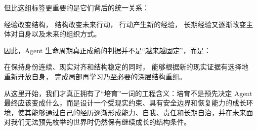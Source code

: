 但比这组标签更重要的是它们背后的统一关系：
\begin{statementbox}
经验改变结构，
结构改变未来行动，
行动产生新的经验，
长期经验又逐渐改变主体对自身以及未来的组织方式。
\end{statementbox}

因此，Agent 生命周期真正成熟的判据并不是“越来越固定”，而是：

\begin{statementbox}
在保持身份连续、现实对齐和结构稳定的同时，
能够根据新的现实证据有选择地重新开放自身，
完成局部再学习乃至必要的深层结构重组。
\end{statementbox}

从这里开始，我们才真正拥有了“培育”一词的工程含义：培育不是预先决定 Agent 最终应该变成什么，而是设计一个受现实约束、具有安全边界和恢复能力的成长环境，使其能够通过自己的经历逐渐形成能力、自我、责任和长期自治，并在未来面对我们无法预先枚举的世界时仍然保有继续成长的结构条件。
